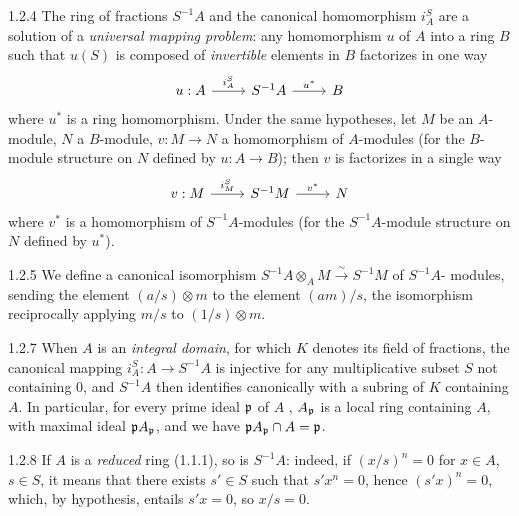 \documentclass[../main.tex]{subfiles}
\begin{document}
\begin{cx}{1.2.4}
The ring of fractions $S^{-1}A$ and the canonical homomorphism $i_A^S$ are a solution of a \emph{universal mapping problem}:
any homomorphism $u$ of $A$ into a ring $B$ such that $u(S)$ is composed of \emph{invertible} elements in $B$ factorizes in
one way
\[
\begin{tikzcd}
  u:A\ar[r,"i_A^S"] & S^{-1}A\ar[r,"u^\ast"] & B
\end{tikzcd}
\]
where $u^\ast$ is a ring homomorphism. Under the same hypotheses, let $M$ be an
$A$-module, $N$ a $B$-module, $v:M\to N$ a homomorphism of $A$-modules (for the
$B$-module structure on $N$ defined by $u:A\to B$); then $v$ is factorizes in a single
way
\[
\begin{tikzcd}
  v:M\ar[r,"i_M^S"] & S^{-1}M\ar[r,"v^\ast"] & N
\end{tikzcd}
\]
where $v^\ast$ is a homomorphism of $S^{-1}A$-modules (for the $S^{-1}A$-module structure 
on $N$ defined by $u^\ast$).
\end{cx}

\begin{cx}{1.2.5}
We define a canonical isomorphism $S^{-1}A\otimes_A M\xrightarrow{\sim} S^{-1}M$ of $S^{-1}A$-
modules, sending the element $(a/s)\otimes m$ to the element $(am)/s$, the isomorphism
reciprocally applying $m/s$ to $(1/s)\otimes m$.
\end{cx}

\begin{cx}{1.2.7}
When $A$ is an \emph{integral domain}, for which $K$ denotes its field of fractions, the canonical mapping $i_A^S:A\to S^{-1}A$
is injective for any multiplicative subset $S$ not containing $0$, and $S^{-1}A$ then identifies canonically with a subring of $K$
containing $A$. In particular, for every prime ideal $\mathfrak{p}$ of $A$ , $A_\mathfrak{p}$ is a local ring containing $A$,
with maximal ideal $\mathfrak{p}A_\mathfrak{p}$, and we have $\mathfrak{p}A_\mathfrak{p}\cap A=\mathfrak{p}$.
\end{cx}

\begin{cx}{1.2.8}
If $A$ is a \emph{reduced} ring (1.1.1), so is $S^{-1}A$: indeed, if $(x/s)^n=0$ for $x\in A$, $s\in S$, it means that
there exists $s'\in S$ such that $s'x^n=0$, hence $(s'x)^n=0$, which, by hypothesis, entails $s'x=0$, so $x/s=0$.
\end{cx}
\end{document}
